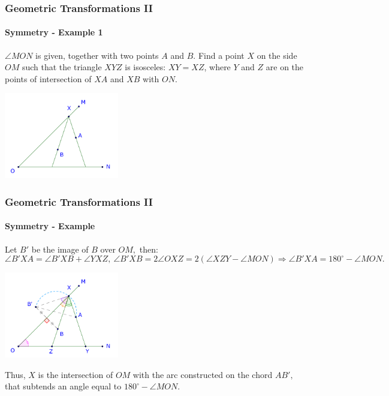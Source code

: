 \documentclass[8pt,xcolor=table,dvipsnames]{beamer}
\newcommand{\dg}{^\circ}
\begin{document}
\begin{frame}[t]
    \frametitle{Geometric Transformations II}
    \framesubtitle{Symmetry - Example 1}
    \begin{example}
        $\angle MON$ is given, together with two points $A$ and $B$.
        Find a point $X$ on the side $OM$ such that the triangle $XYZ$ is isosceles: $XY = XZ$, 
        where $Y$ and $Z$ are on the points of intersection of $XA$ and $XB$ with $ON.$ 
    \end{example}

    \begin{center}
        \includegraphics[width=5cm]{./svg/pdf/symmetry-1a.pdf}
    \end{center}
\end{frame}

\begin{frame}[t]
    \frametitle{Geometric Transformations II}
    \framesubtitle{Symmetry - Example }
    Let $B'$ be the image of $B$ over $OM,$ then:
    \[
        \angle B'XA = \angle B'XB + \angle YXZ,\  \angle B'XB = 2\angle OXZ = 2(\angle XZY - \angle MON)
        \Rightarrow \angle B'XA = 180\dg - \angle MON.
    \]

    \begin{center}
        \includegraphics[width=5cm]{./svg/pdf/symmetry-1b.pdf}
    \end{center}
    Thus, $X$ is the intersection of $OM$ with the arc constructed on the chord $AB',$ that subtends an angle equal to $180\dg - \angle MON.$
\end{frame}
\end{document}
